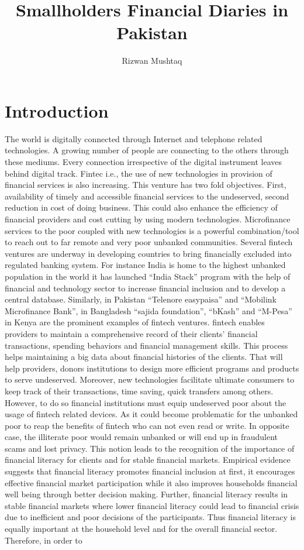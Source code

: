 \documentclass[12pt,a4paper]{article}
\author{Rizwan Mushtaq}
\begin{document}
	
\title{Smallholders Financial Diaries in Pakistan}	
\maketitle	
	
\section{Introduction}


The world is digitally connected through Internet and telephone related technologies. A growing number of people are connecting to the others through these mediums. Every connection irrespective of the digital instrument leaves behind digital track. Fintec i.e., the use of new technologies in provision of financial services is also increasing. This venture has two fold objectives. First, availability of timely and accessible financial services to the undeserved, second reduction in cost of doing business. This could also enhance the efficiency of financial providers and cost cutting by using modern technologies. Microfinance services to the poor coupled with new technologies is a powerful combination/tool to reach out to far remote and very poor unbanked communities. Several fintech ventures are underway in developing countries to bring financially excluded into regulated banking system. For instance India is home to the highest unbanked population in the world it has launched ``India Stack'' program with the help of financial and technology sector to increase financial inclusion and to develop a central database. Similarly, in Pakistan ``Telenore easypaisa'' and ``Mobilink Microfinance Bank'', in Bangladesh ``sajida foundation'', ``bKash'' and ``M-Pesa'' in Kenya are the prominent examples of fintech ventures.  fintech enables providers to maintain a comprehensive record of their clients' financial transactions, spending behaviors and financial management skills. This process helps maintaining a big data about financial histories of the clients. That will help providers, donors institutions to design more efficient programs and products to serve undeserved. Moreover, new technologies facilitate ultimate consumers to keep track of their transactions, time saving, quick transfers among others. However, to do so financial institutions must equip undeserved poor about the usage of fintech related devices. As it could become problematic for the unbanked poor to reap the benefits of fintech who can not even read or write. In opposite case, the illiterate poor would remain unbanked or will end up in fraudulent scams and lost privacy. This notion leads to the recognition of the importance of financial literacy for clients and for stable financial markets. Empirical evidence suggests that financial literacy promotes financial inclusion at first, it encourages effective financial market participation while it also improves households financial well being through better decision making. Further, financial literacy results in stable financial markets where lower financial literacy could lead to financial crisis due to inefficient and poor decisions of the participants. Thus financial literacy is equally important at the household level and for the overall financial sector. Therefore, in order to 
\end{document}

